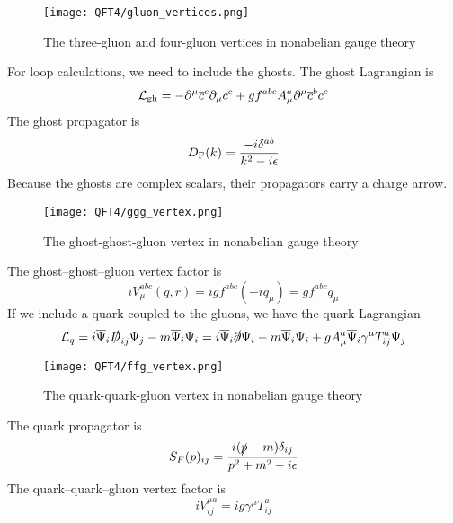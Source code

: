 \begin{figure}[!h]
	\centering
	\texttt{[image: QFT4/gluon\_vertices.png]}
	\caption{The three-gluon and four-gluon vertices in nonabelian gauge theory}
\end{figure}

\noindent
For loop calculations, we need to include the ghosts. The ghost Lagrangian is
\[\mathcal{L}_{\rm gh} = -\partial^{\mu}\overline{c}^c \partial_{\mu}c^c + gf^{abc}A^a_{\mu}\partial^{\mu}\overline{c}^b c^c\]
The ghost propagator is
\[D_{\rm F}(k) = \frac{-i\delta^{ab}}{k^2-i\epsilon}\]
Because the ghosts are complex scalars, their propagators carry a charge arrow. 

\begin{figure}[!h]
	\centering
	\texttt{[image: QFT4/ggg\_vertex.png]}
	\caption{The ghost-ghost-gluon vertex in nonabelian gauge theory}
\end{figure}

\noindent
The ghost–ghost–gluon vertex factor is
\[iV^{abc}_{\mu}(q,r) = igf^{abc}(-iq_{\mu}) = gf^{abc}q_{\mu}\]
If we include a quark coupled to the gluons, we have the quark Lagrangian
\[\mathcal{L}_{q} = i\overline{\Psi}_{i}\slashed{D}_{ij}\Psi_{j} - m\overline{\Psi}_{i}\Psi_{i} = i\overline{\Psi}_{i}\slashed{\partial}\Psi_{i} - m\overline{\Psi}_{i}\Psi_{i} + gA^a_{\mu}\overline{\Psi}_{i} \gamma^{\mu} T^a_{ij} \Psi_j \]

\begin{figure}[!h]
	\centering
	\texttt{[image: QFT4/ffg\_vertex.png]}
	\caption{The quark-quark-gluon vertex in nonabelian gauge theory}
\end{figure}

\noindent
The quark propagator is
\[S_F(p)_{ij} = \frac{i(\slashed{p}-m)\delta_{ij}}{p^2+m^2 - i\epsilon}\]
The quark–quark–gluon vertex factor is
\[iV^{\mu a}_{ij} =  ig\gamma^{\mu}T^a_{ij}\]

